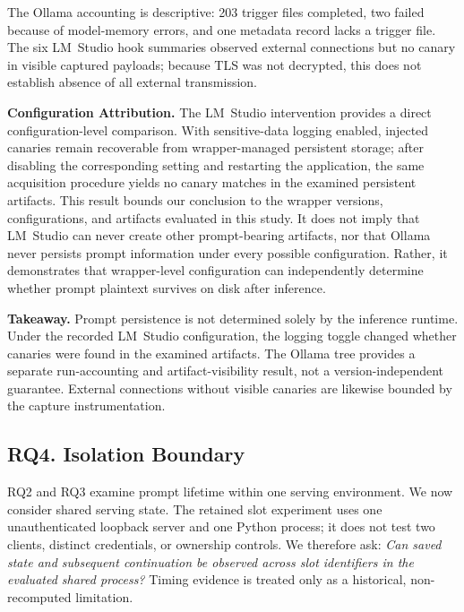 \documentclass[journal,tifs]{IEEEtran}
\begin{document}
The Ollama accounting is descriptive: 203 trigger files completed, two
failed because of model-memory errors, and one metadata record lacks a
trigger file. The six LM~Studio hook summaries observed external
connections but no canary in visible captured payloads; because TLS was not
decrypted, this does not establish absence of all external transmission.


{\bf Configuration Attribution.}
The LM~Studio intervention provides a direct configuration-level
comparison. With sensitive-data logging enabled, injected canaries remain
recoverable from wrapper-managed persistent storage; after disabling the
corresponding setting and restarting the application, the same
acquisition procedure yields no canary matches in the examined
persistent artifacts. This result bounds our conclusion to the wrapper versions,
configurations, and artifacts evaluated in this study. It does not imply
that LM~Studio can never create other prompt-bearing artifacts, nor that
Ollama never persists prompt information under every possible
configuration. Rather, it demonstrates that wrapper-level configuration
can independently determine whether prompt plaintext survives on disk
after inference.


{\bf Takeaway.}
Prompt persistence is not determined solely by the inference runtime.
Under the recorded LM~Studio configuration, the logging toggle changed
whether canaries were found in the examined artifacts. The Ollama tree
provides a separate run-accounting and artifact-visibility result, not a
version-independent guarantee. External connections without visible
canaries are likewise bounded by the capture instrumentation.

\subsection{RQ4. Isolation Boundary}
\label{sec:rq4}

RQ2 and RQ3 examine prompt lifetime within one serving environment. We
now consider shared serving state. The retained slot experiment uses one
unauthenticated loopback server and one Python process; it does not test
two clients, distinct credentials, or ownership controls. We therefore ask:
\emph{Can saved state and subsequent continuation be observed across slot
identifiers in the evaluated shared process?} Timing evidence is treated
only as a historical, non-recomputed limitation.
\end{document}
